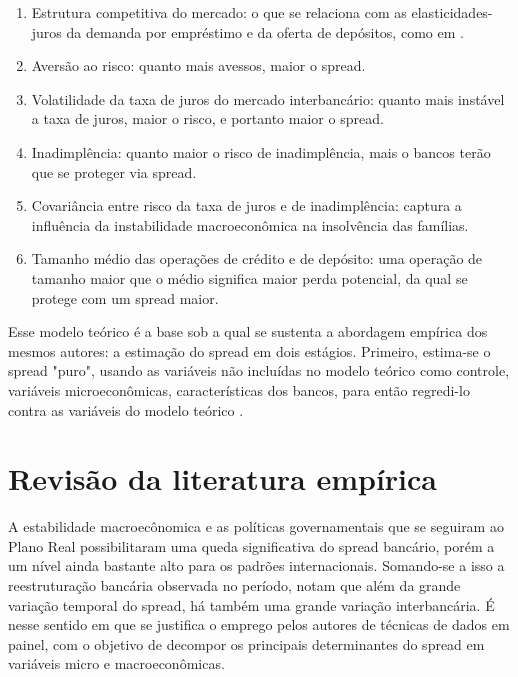 \documentclass[a4paper, 12pt, openany, oneside, brazil]{abntex2}
\begin{document}
	\begin{enumerate}
		\item Estrutura competitiva do mercado: o que se relaciona com as elasticidades-juros da demanda por empréstimo e da oferta de depósitos, como em .
		\item Aversão ao risco: quanto mais avessos, maior o spread.
		\item Volatilidade da taxa de juros do mercado interbancário: quanto mais instável a taxa de juros, maior o risco, e portanto maior o spread.
		\item Inadimplência: quanto maior o risco de inadimplência, mais o bancos terão que se proteger via spread.
		\item Covariância entre risco da taxa de juros e de inadimplência: captura a influência da instabilidade macroeconômica na insolvência das famílias. \cite{oreiro}
		\item Tamanho médio das operações de crédito e de depósito: uma operação de tamanho maior que o médio significa maior perda potencial, da qual se protege com um spread maior.
	\end{enumerate}

    Esse modelo teórico é a base sob a qual se sustenta a abordagem empírica
    dos mesmos autores: a estimação do spread em dois estágios. Primeiro,
    estima-se o spread "puro", usando as variáveis não incluídas no modelo
    teórico como controle, variáveis microeconômicas, características dos
    bancos, para então regredi-lo contra as variáveis do modelo teórico
    .

\section{Revisão da literatura empírica}

    A estabilidade macroecônomica e as políticas governamentais que se seguiram
    ao Plano Real possibilitaram uma queda significativa do spread bancário,
    porém a um nível ainda bastante alto para os padrões internacionais.
    Somando-se a isso a reestruturação bancária observada no período,
     notam que além da grande variação temporal do
    spread, há também uma grande variação interbancária. É nesse sentido em que
    se justifica o emprego pelos autores de técnicas de dados em painel, com o
    objetivo de decompor os principais determinantes do spread em variáveis
    micro e macroeconômicas.
\end{document}
